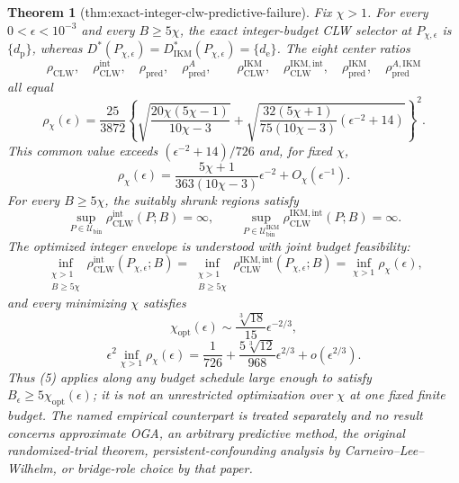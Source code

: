 \documentclass{article}
\newtheorem{theorem}{Theorem}
\begin{document}
\begin{theorem}[thm:exact-integer-clw-predictive-failure]\label{thm:exact-integer-clw-predictive-failure}
Fix \(\chi>1\).  For every \(0<\epsilon<10^{-3}\) and every \(B\ge5\chi\), the exact integer-budget CLW selector at \(P_{\chi,\epsilon}\) is \(\{d_{\mathrm p}\}\), whereas \(D^*(P_{\chi,\epsilon})=D_{\mathrm{IKM}}^*(P_{\chi,\epsilon})=\{d_{\mathrm e}\}\).  The eight center ratios
\[
 \rho_{\mathrm{CLW}},\quad
 \rho_{\mathrm{CLW}}^{\mathrm{int}},\quad
 \rho_{\mathrm{pred}},\quad
 \rho_{\mathrm{pred}}^A,
 \qquad
 \rho_{\mathrm{CLW}}^{\mathrm{IKM}},\quad
 \rho_{\mathrm{CLW}}^{\mathrm{IKM,int}},\quad
 \rho_{\mathrm{pred}}^{\mathrm{IKM}},\quad
 \rho_{\mathrm{pred}}^{A,\mathrm{IKM}}
\]
all equal
\[
 \rho_\chi(\epsilon)=\frac{25}{3872}
 \left\{
 \sqrt{\frac{20\chi(5\chi-1)}{10\chi-3}}
 +\sqrt{\frac{32(5\chi+1)}{75(10\chi-3)}
 (\epsilon^{-2}+14)}
 \right\}^{2}.                                             \tag{1}
\]
This common value exceeds \((\epsilon^{-2}+14)/726\) and, for fixed \(\chi\),
\[
 \rho_\chi(\epsilon)=
 \frac{5\chi+1}{363(10\chi-3)}\epsilon^{-2}
 +O_\chi(\epsilon^{-1}).                                  \tag{2}
\]
For every \(B\ge5\chi\), the suitably shrunk regions satisfy
\[
 \sup_{P\in\mathcal U_{\mathrm{bin}}}
 \rho_{\mathrm{CLW}}^{\mathrm{int}}(P;B)=\infty,
 \qquad
 \sup_{P\in\mathcal U_{\mathrm{bin}}^{\mathrm{IKM}}}
 \rho_{\mathrm{CLW}}^{\mathrm{IKM,int}}(P;B)=\infty.      \tag{3}
\]
The optimized integer envelope is understood with joint budget feasibility:
\[
 \inf_{\substack{\chi>1\\ B\ge5\chi}}
 \rho_{\mathrm{CLW}}^{\mathrm{int}}(P_{\chi,\epsilon};B)
 =\inf_{\substack{\chi>1\\ B\ge5\chi}}
 \rho_{\mathrm{CLW}}^{\mathrm{IKM,int}}(P_{\chi,\epsilon};B)
 =\inf_{\chi>1}\rho_\chi(\epsilon),                     \tag{4}
\]
and every minimizing \(\chi\) satisfies
\[
 \chi_{\mathrm{opt}}(\epsilon)
 \sim\frac{\sqrt[3]{18}}{15}\epsilon^{-2/3},
\]
\[
 \epsilon^2\inf_{\chi>1}\rho_\chi(\epsilon)
 =\frac1{726}+\frac{5\sqrt[3]{12}}{968}\epsilon^{2/3}
 +o(\epsilon^{2/3}).                                      \tag{5}
\]
Thus (5) applies along any budget schedule large enough to satisfy \(B_\epsilon\ge5\chi_{\mathrm{opt}}(\epsilon)\); it is not an unrestricted optimization over \(\chi\) at one fixed finite budget.  The named empirical counterpart is treated separately and no result concerns approximate OGA, an arbitrary predictive method, the original randomized-trial theorem, persistent-confounding analysis by Carneiro--Lee--Wilhelm, or bridge-role choice by that paper.
\end{theorem}
\end{document}
